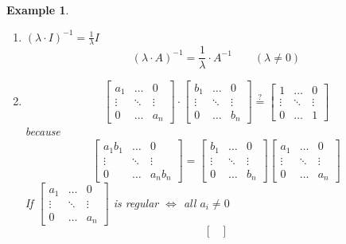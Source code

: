 \documentclass[a4paper,landscape,twocolumn]{article}
\newtheorem{ex}{Example}
\begin{document}
\begin{ex}
  \begin{enumerate}
    \item $(\lambda \cdot I)^{-1} = \frac1\lambda I$
      \[ (\lambda \cdot A)^{-1} = \frac1\lambda \cdot A^{-1} \qquad (\lambda \neq 0) \]
    \item
      \[
        \begin{bmatrix}
          a_1 & \ldots & 0 \\
          \vdots & \ddots & \vdots \\
          0 & \ldots & a_n
        \end{bmatrix} \cdot
        \begin{bmatrix}
          b_1 & \ldots & 0 \\
          \vdots & \ddots & \vdots \\
          0 & \ldots & b_n
        \end{bmatrix}
        \overset{?}{=}
        \begin{bmatrix}
          1 & \ldots & 0 \\
          \vdots & \ddots & \vdots \\
          0 & \ldots & 1
        \end{bmatrix}
      \] because \[
        \begin{bmatrix}
          a_1 b_1 & \ldots & 0 \\
          \vdots & \ddots & \vdots \\
          0 & \ldots & a_n b_n
        \end{bmatrix} =
        \begin{bmatrix}
          b_1 & \ldots & 0 \\
          \vdots & \ddots & \vdots \\
          0 & \ldots & b_n
        \end{bmatrix}
        \begin{bmatrix}
          a_1 & \ldots & 0 \\
          \vdots & \ddots & \vdots \\
          0 & \ldots & a_n
        \end{bmatrix}
      \]
      If $
      \begin{bmatrix}
        a_1 & \ldots & 0 \\
        \vdots & \ddots & \vdots \\
        0 & \ldots & a_n
      \end{bmatrix}
      $ is regular $\Leftrightarrow$ all $a_i \neq 0$
      \[
        \begin{bmatrix}

\end{bmatrix}\]
\end{enumerate}
\end{ex}
\end{document}
